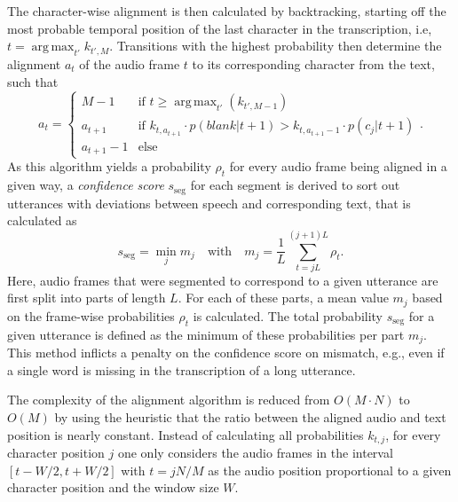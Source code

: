 \documentclass[runningheads]{llncs}
\DeclareMathOperator{\argmax}{arg\,max}
\begin{document}
The character-wise alignment is then calculated by backtracking, starting off the most probable temporal position of the last character in the transcription, i.e, $t=\argmax_{t'} k_{t',M}$.
Transitions with the highest probability then determine the alignment $a_t$ of the audio frame $t$ to its corresponding character from the text, such that
\begin{equation}
a_{t} = \begin{cases}
M - 1 & \text{if } t \geqslant \argmax_{t'}(k_{t',M-1})\\
a_{t+1} & \text{if } k_{t,a_{t+1}} \cdot p( blank | t + 1) > k_{t,a_{t+1} - 1} \cdot p(c_j | t + 1)\\
a_{t+1} - 1 & \text{else}
\end{cases}.
\end{equation}
As this algorithm yields a probability  $\rho_t$ for every audio frame being aligned in a given way,
a \emph{confidence score} $s_{\text{seg}}$ for each segment is derived to sort out utterances with deviations between speech and corresponding text, that is calculated as
\begin{equation}
s_{\text{seg}} = \min_j m_j \quad \text{with}\quad m_j = \frac{1}{L} \sum_{t=jL}^{(j+1)L}{\rho_t}.
\end{equation}
Here, audio frames that were segmented to correspond to a given utterance are first split into parts of length $L$.
For each of these parts, a mean value $m_j$ based on the frame-wise probabilities $\rho_t$ is calculated.
The total probability $s_{\text{seg}}$ for a given utterance is defined as the minimum of these probabilities per part $m_j$.
This method inflicts a penalty on the confidence score on mismatch, e.g., even if a single word is missing in the transcription of a long utterance.


The complexity of the alignment algorithm is reduced from $O(M \cdot N)$ to $O(M)$ by using the heuristic that the ratio between the aligned audio and text position is nearly constant.
Instead of calculating all probabilities $k_{t,j}$, for every character position $j$ one only considers the audio frames in the interval $[t - W/2, t + W/2]$ with $t = jN/M$ as the audio position proportional to a given character position and the window size $W$.
\end{document}
